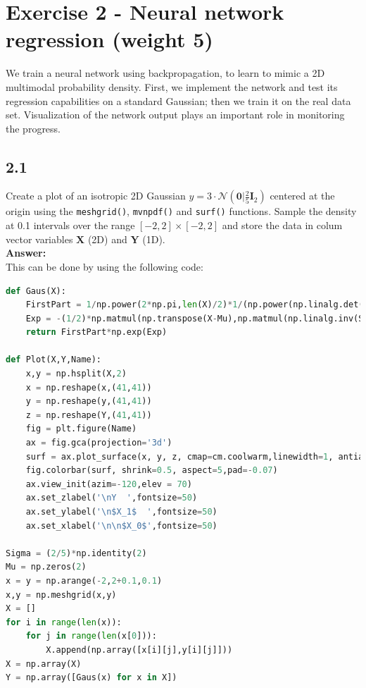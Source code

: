 \documentclass[a4paper]{article}
\begin{document}
\section*{Exercise 2 - Neural network regression (weight 5)}

We train a neural network using backpropagation, to learn to mimic a 2D multimodal probability density. First, we implement the network and test its regression capabilities on a standard Gaussian; then we train it on the real data set. Visualization of the network output plays an important role in monitoring the progress.

\subsection*{2.1}

Create a plot of an isotropic 2D Gaussian $y = 3 \cdot \mathcal{N}(\textbf{0}|\frac{2}{5}\textbf{I}_2)$ centered at the origin using the \texttt{meshgrid()}, \texttt{mvnpdf()} and \texttt{surf()} functions. Sample the density at 0.1 intervals over the range $[-2,2] \times [-2,2]$ and store the data in colum vector variables $\textbf{X}$ (2D) and $\textbf{Y}$ (1D).\\

\textbf{Answer:}\\


This can be done by using the following code:

\begin{lstlisting}[language=Python]
def Gaus(X):
    FirstPart = 1/np.power(2*np.pi,len(X)/2)*1/(np.power(np.linalg.det(Sigma),0.5))
    Exp = -(1/2)*np.matmul(np.transpose(X-Mu),np.matmul(np.linalg.inv(Sigma),X-Mu))
    return FirstPart*np.exp(Exp)

def Plot(X,Y,Name):
    x,y = np.hsplit(X,2)
    x = np.reshape(x,(41,41))
    y = np.reshape(y,(41,41))
    z = np.reshape(Y,(41,41))
    fig = plt.figure(Name)
    ax = fig.gca(projection='3d')
    surf = ax.plot_surface(x, y, z, cmap=cm.coolwarm,linewidth=1, antialiased=True)
    fig.colorbar(surf, shrink=0.5, aspect=5,pad=-0.07)
    ax.view_init(azim=-120,elev = 70)
    ax.set_zlabel('\nY  ',fontsize=50)
    ax.set_ylabel('\n$X_1$  ',fontsize=50)
    ax.set_xlabel('\n\n$X_0$',fontsize=50)

Sigma = (2/5)*np.identity(2)
Mu = np.zeros(2)
x = y = np.arange(-2,2+0.1,0.1)
x,y = np.meshgrid(x,y)
X = []
for i in range(len(x)):
    for j in range(len(x[0])):
        X.append(np.array([x[i][j],y[i][j]]))
X = np.array(X)
Y = np.array([Gaus(x) for x in X])
\end{lstlisting}
\end{document}
